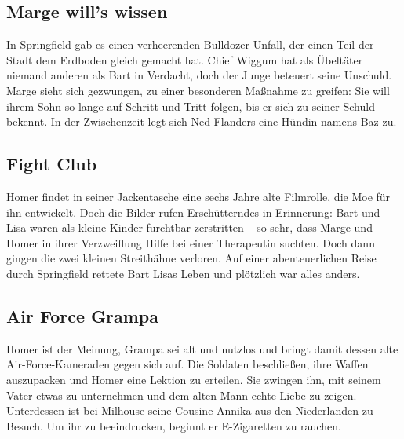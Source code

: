 \subsection{Marge will's wissen}
In Springfield gab es einen verheerenden Bulldozer-Unfall, der einen Teil der Stadt dem Erdboden gleich gemacht hat. Chief Wiggum hat als Übeltäter niemand anderen als Bart in Verdacht, doch der Junge beteuert seine Unschuld. Marge sieht sich gezwungen, zu einer besonderen Maßnahme zu greifen: Sie will ihrem Sohn so lange auf Schritt und Tritt folgen, bis er sich zu seiner Schuld bekennt. In der Zwischenzeit legt sich Ned Flanders eine Hündin namens Baz zu.


\subsection{Fight Club}
Homer findet in seiner Jackentasche eine sechs Jahre alte Filmrolle, die Moe für ihn entwickelt. Doch die Bilder rufen Erschütterndes in Erinnerung: Bart und Lisa waren als kleine Kinder furchtbar zerstritten -- so sehr, dass Marge und Homer in ihrer Verzweiflung Hilfe bei einer Therapeutin suchten. Doch dann gingen die zwei kleinen Streithähne verloren. Auf einer abenteuerlichen Reise durch Springfield rettete Bart Lisas Leben und plötzlich war alles anders.


\subsection{Air Force Grampa}\label{TABF13}
Homer ist der Meinung, Grampa sei alt und nutzlos und bringt damit dessen alte Air-Force-Kameraden gegen sich auf. Die Soldaten beschließen, ihre Waffen auszupacken und Homer eine Lektion zu erteilen. Sie zwingen ihn, mit seinem Vater etwas zu unternehmen und dem alten Mann echte Liebe zu zeigen. Unterdessen ist bei Milhouse seine Cousine Annika aus den Niederlanden zu Besuch. Um ihr zu beeindrucken, beginnt er E-Zigaretten zu rauchen.

